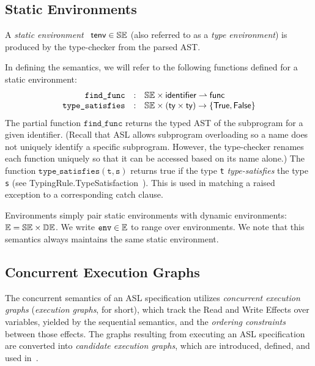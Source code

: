 \documentclass{book}
\newcommand\tenv[0]{\textsf{tenv}}
\newcommand\findfunc[0]{\texttt{find\_func}}
\newcommand\typesatisfies[0]{\texttt{type\_satisfies}}
\newcommand\env[0]{\texttt{env}}
\begin{document}
\subsection{Static Environments \label{sec:staticenvironments}}

A \emph{static environment}~\cite{ASLTypingReference} $\tenv \in \staticenvs$ (also referred to as a \emph{type environment})
is produced by the type-checker from the parsed AST.

In defining the semantics, we will refer to the following functions defined for a static environment:
\[
  \begin{array}{rcl}
    \findfunc       &:& \staticenvs \times \identifier \partialto \func\\
    \typesatisfies  &:& \staticenvs \times (\ty \times \ty) \rightarrow \{\True, \False\}
  \end{array}
\]
The partial function $\findfunc$ returns the typed AST of the subprogram for a given identifier.
(Recall that ASL allows subprogram overloading so a name does not uniquely identify
a specific subprogram.
However, the type-checker renames each function uniquely so that it can be accessed based
on its name alone.)
%
The function $\typesatisfies(\texttt{t}, \texttt{s})$ returns true
if the type \texttt{t} \emph{type-satisfies} the type \texttt{s}
(see TypingRule.TypeSatisfaction~\cite{ASLTypingReference}).
This is used in matching a raised exception to a corresponding catch clause.

Environments simply pair static environments with dynamic environments:
$\mathbb{E} = \mathbb{SE} \times \mathbb{DE}$. We write $\env \in \envs$ to range over environments.
%
We note that this semantics always maintains the same static environment.

\subsection{Concurrent Execution Graphs \label{sec:concurrentexecutiongraphs}}

The concurrent semantics of an ASL specification utilizes \emph{concurrent execution graphs}
(\emph{execution graphs}, for short),
which track the Read and Write Effects over variables, yielded by the sequential semantics,
and the \emph{ordering constraints} between those effects.
The graphs resulting from executing an ASL specification are converted into
\emph{candidate execution graphs}, which are introduced, defined,
and used in~\cite{AlglaveMT14,alglave2016syntax,AlglaveDGHM21}.
\end{document}
